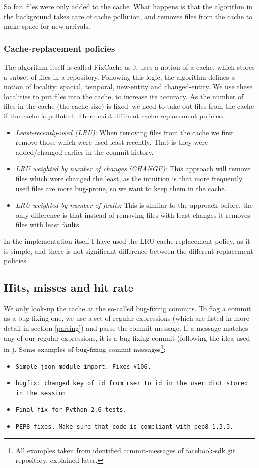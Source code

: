 \documentclass[12pt,twoside,notitlepage]{report}
\newcommand{\fxch}{FixCache}
\begin{document}
So far, files were only added to the cache. What happens is that the algorithm in the background takes care of cache pollution, and removes files from the cache to make space for new arrivals.
\subsubsection*{Cache-replacement policies}
The algorithm itself is called \fxch{} as it uses a notion of a cache, which stores a subset of files in a repository. Following this logic, the algorithm defines a notion of locality: spacial, temporal, new-entity and changed-entity. We use these localities to put files into the cache, to increase its accuracy. As the number of files in the cache (the cache-size) is fixed, we need to take out files from the cache if the cache is polluted. There exist different cache replacement policies\cite{FixCache}:
\begin{itemize}
\item \textit{Least-recently-used (LRU)}: When removing files from the cache we first remove those which were used least-recently. That is they were added/changed earlier in the commit history.
\item \textit{LRU weighted by number of changes (CHANGE)}: This approach will remove files which were changed the least, as the intuition is that more frequently used files are more bug-prone, so we want to keep them in the cache.
\item \textit{LRU weighted by number of faults}: This is similar to the approach before, the only difference is that instead of removing files with least changes it removes files with least faults.
\end{itemize}
In the implementation itself I have used the LRU cache replacement policy, as it is simple, and there is not significant difference between the different replacement policies\cite{FixCache}\cite{Sadowski}\cite{Bugcache}.
\subsection{Hits, misses and hit rate}
We only look-up the cache at the so-called bug-fixing commits. To flag a commit as a bug-fixing one, we use a set of regular expressions (which are listed in more detail in section \ref{parsing}) and parse the commit message. If a message matches any of our regular expressions, it is a bug-fixing commit (following the idea used in \cite{KimZim}).
Some examples of bug-fixing commit messages\footnote{All examples taken from identified commit-messages of facebook-sdk.git repository, explained later.}:
\begin{itemize}
\item \texttt{Simple json module import. Fixes \#106.}

\item \texttt{bugfix: changed key of id from user to id in the user dict stored in the session}
\item \texttt{Final fix for Python 2.6 tests.}
\item \texttt{PEP8 fixes. Make sure that code is compliant with pep8 1.3.3.}
\end{itemize}
\end{document}
